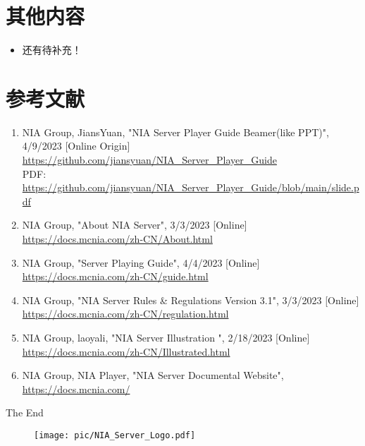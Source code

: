 \documentclass{beamer}
\begin{document}
\section{其他内容}
\begin{frame}
    \begin{itemize}
        \item 还有待补充！
    \end{itemize}
\end{frame}
 
\section{参考文献}
\begin{frame}[allowframebreaks]
    \begin{enumerate}
        \item NIA Group, JiansYuan, "NIA Server Player Guide Beamer(like PPT)", 4/9/2023 [Online Origin] \\
        \url{https://github.com/jiansyuan/NIA_Server_Player_Guide} \\
        PDF: \url{https://github.com/jiansyuan/NIA_Server_Player_Guide/blob/main/slide.pdf}
        \item NIA Group, "About NIA Server", 3/3/2023 [Online] \\
        \url{https://docs.mcnia.com/zh-CN/About.html}
        \item NIA Group, "Server Playing Guide", 4/4/2023 [Online] \\
        \url{https://docs.mcnia.com/zh-CN/guide.html}
        \item NIA Group, "NIA Server Rules \& Regulations Version 3.1", 3/3/2023 [Online] \\
        \url{https://docs.mcnia.com/zh-CN/regulation.html}
        \item NIA Group, laoyali, "NIA Server Illustration ", 2/18/2023 [Online] \\
        \url{https://docs.mcnia.com/zh-CN/Illustrated.html}
        \item NIA Group, NIA Player, "NIA Server Documental Website", \\
        \url{https://docs.mcnia.com/}
    \end{enumerate}
\end{frame}

\begin{frame}
    \begin{center}
        {\Huge\calligra The End}
    \end{center}
\end{frame}

\begin{frame}
    \begin{figure}[htpb] 
        \begin{center}
            \texttt{[image: pic/NIA\_Server\_Logo.pdf]}
        \end{center} 
    \end{figure} 
\end{frame}
\end{document}
